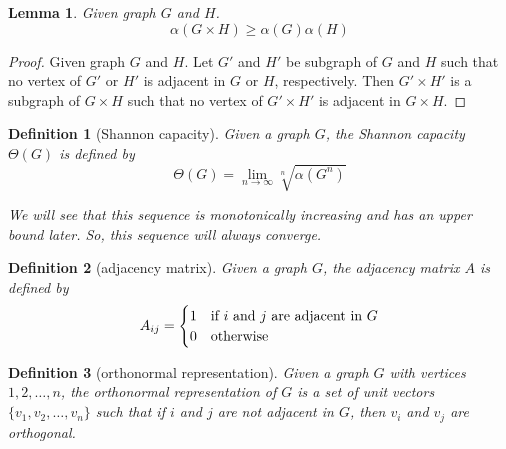 \documentclass{article}
\newtheorem{definition}{Definition}[section]
\newtheorem{lemma}{Lemma}[section]
\begin{document}
      \begin{lemma}\label{lemma:alphaIncreasing}
            Given graph $ G $ and $ H $.
            \begin{equation}
                  \alpha(G \times H) \geq \alpha(G) \alpha(H)
            \end{equation}
      \end{lemma}

      \begin{proof}
            Given graph $ G $ and $ H $. Let $ G' $ and $ H' $ be subgraph of $ G $ and $ H $ such that no vertex of $ G' $ or $ H' $ is adjacent in $ G $ or $ H $, respectively. Then $ G' \times H' $ is a subgraph of $ G \times H $ such that no vertex of $ G' \times H' $ is adjacent in $ G \times H $.
      \end{proof}

      \begin{definition}[Shannon capacity]\label{def:shannonCapacity}
            Given a graph $ G $, the Shannon capacity $ \Theta(G) $ is defined by
            \begin{equation}
                  \Theta(G) = \lim_{n \to \infty} \sqrt[n]{\alpha(G^n)} 
            \end{equation}

            We will see that this sequence is monotonically increasing and has an upper bound later. So, this sequence will always converge.
      \end{definition}

      \begin{definition}[adjacency matrix]\label{def:adjacencyMatrix}
            Given a graph $ G $, the adjacency matrix $ A $ is defined by
            \begin{equation}
                  A_{ij} = \begin{cases}
                        1 & \text{if $ i $ and $ j $ are adjacent in $ G $} \\
                        0 & \text{otherwise}
                  \end{cases}
            \end{equation}
      \end{definition}

      \begin{definition}[orthonormal representation]\label{def:orthonormalRepresentation}
            Given a graph $ G $ with vertices $ 1,2,\dots,n $, the orthonormal representation of $ G $ is a set of unit vectors $ \{v_1, v_2, \dots, v_n\} $ such that if $ i $ and $ j $ are not adjacent in $ G $, then $ v_i $ and $ v_j $ are orthogonal.
      \end{definition}
\end{document}
